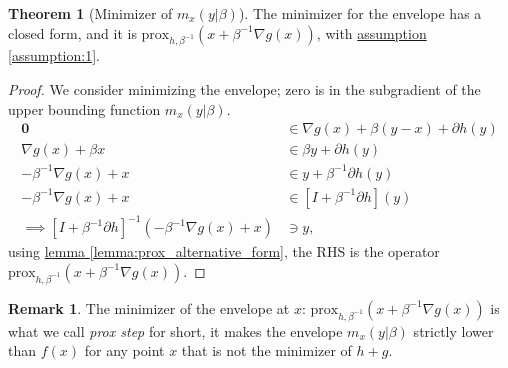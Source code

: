 \documentclass[]{article}
\theoremstyle{definition}
\newtheorem{theorem}{Theorem}       %
\newtheorem{remark}{Remark}[subsection]
{
    \newtheorem{assumption}{Assumption}
}
\begin{document}
        \begin{theorem}[Minimizer of $m_x(y|\beta)$]\label{thm:minimizer_envelope}
            The minimizer for the envelope has a closed form, and it is $\text{prox}_{h, \beta^{-1}}(x + \beta^{-1}\nabla g(x))$, with \hyperref[assumption:1]{assumption \ref*{assumption:1}}. 
        \end{theorem}
        \begin{proof}
            We consider minimizing the envelope; zero is in the subgradient of the upper bounding function $m_x(y|\beta)$. 
            \begin{align*}
                \mathbf 0 &\in 
                \nabla g(x) + {\beta}(y - x) + \partial h(y)
                \\
                \nabla g(x) + \beta x & \in
                \beta y + \partial h(y)
                \\
                -\beta^{-1} \nabla g(x) + x &\in y + \beta^{-1} \partial h(y)
                \\
                -\beta^{-1} \nabla g(x) + x &\in [I + \beta^{-1} \partial h](y)
                \\
                \implies
                [I + \beta^{-1}\partial h]^{-1}(- \beta^{-1} \nabla g(x) + x) 
                & \ni y,
            \end{align*}
            using \hyperref[lemma:prox_alternative_form]{lemma \ref*{lemma:prox_alternative_form}}, the RHS is the operator $\text{prox}_{h, \beta^{-1}}(x + \beta^{-1}\nabla g(x))$. 
        \end{proof}
        \begin{remark}
            The minimizer of the envelope at $x$: $\text{prox}_{h, \beta^{-1}}(x + \beta^{-1}\nabla g(x))$ is what we call \emph{prox step} for short, it makes the envelope $m_x(y|\beta)$ strictly lower than $f(x)$ for any point $x$ that is not the minimizer of $h + g$. 
        \end{remark}
\end{document}
